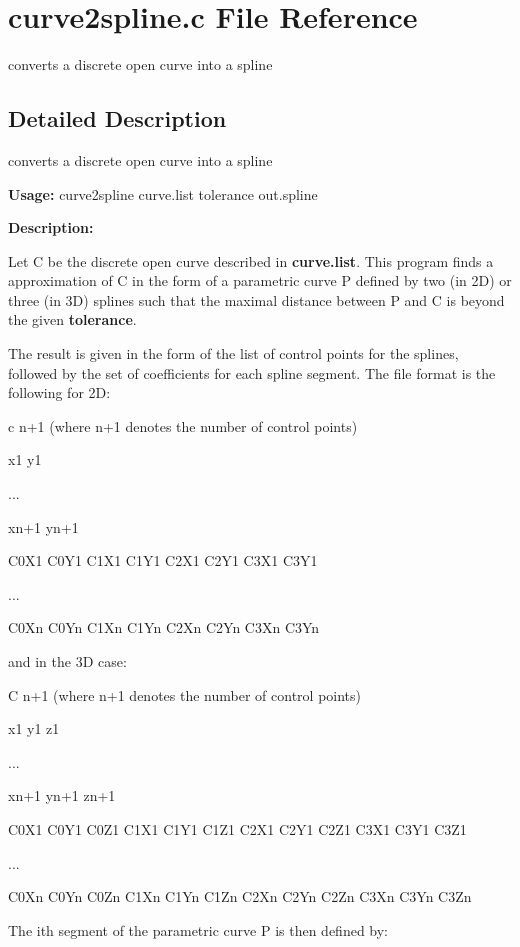 \section{curve2spline.c File Reference}
\label{curve2spline_8c}
converts a discrete open curve into a spline 



\subsection{Detailed Description}
converts a discrete open curve into a spline 

{\bf Usage:} curve2spline curve.list tolerance out.spline

{\bf Description:}

Let C be the discrete open curve described in {\bf curve.list}. This program finds a approximation of C in the form of a parametric curve P defined by two (in 2D) or three (in 3D) splines such that the maximal distance between P and C is beyond the given {\bf tolerance}.

The result is given in the form of the list of control points for the splines, followed by the set of coefficients for each spline segment. The file format is the following for 2D:

c n+1 (where n+1 denotes the number of control points)\par
 x1 y1\par
 ...\par
 xn+1 yn+1\par
 C0X1 C0Y1 C1X1 C1Y1 C2X1 C2Y1 C3X1 C3Y1\par
 ...\par
 C0Xn C0Yn C1Xn C1Yn C2Xn C2Yn C3Xn C3Yn\par


and in the 3D case:

C n+1 (where n+1 denotes the number of control points)\par
 x1 y1 z1\par
 ...\par
 xn+1 yn+1 zn+1\par
 C0X1 C0Y1 C0Z1 C1X1 C1Y1 C1Z1 C2X1 C2Y1 C2Z1 C3X1 C3Y1 C3Z1\par
 ...\par
 C0Xn C0Yn C0Zn C1Xn C1Yn C1Zn C2Xn C2Yn C2Zn C3Xn C3Yn C3Zn\par


The ith segment of the parametric curve P is then defined by:

